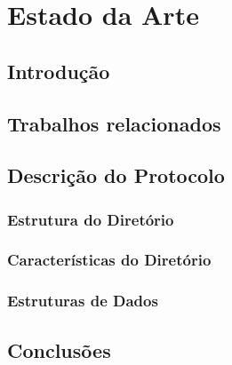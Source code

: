 \chapter{Estado da Arte}
\label{chap:estado-da-arte}

\section{Introdução}
\label{chap2:sec:intro}

\section{Trabalhos relacionados}


\section{Descrição do Protocolo}

\subsection{Estrutura do Diretório}

\subsection{Características do Diretório}

\subsection{Estruturas de Dados}

\section{Conclusões}
\label{chap2:sec:concs}
